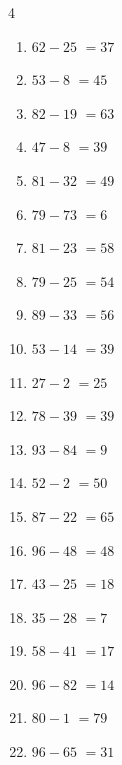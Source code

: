 \newpage
\resetdrill

\begin{multicols}{4}
\begin{enumerate}
  \itemsep=5pt
  \item $62-25$
        $=37$

  \item $53-8$
        $=45$

  \item $82-19$
        $=63$

  \item $47-8$
        $=39$

  \item $81-32$
        $=49$

  \item $79-73$
        $=6$

  \item $81-23$
        $=58$

  \item $79-25$
        $=54$

  \item $89-33$
        $=56$

  \item $53-14$
        $=39$

  \item $27-2$
        $=25$

  \item $78-39$
        $=39$

  \item $93-84$
        $=9$

  \item $52-2$
        $=50$

  \item $87-22$
        $=65$

  \item $96-48$
        $=48$

  \item $43-25$
        $=18$

  \item $35-28$
        $=7$

  \item $58-41$
        $=17$

  \item $96-82$
        $=14$

  \item $80-1$
        $=79$

  \item $96-65$
        $=31$


\end{enumerate}
\end{multicols}

